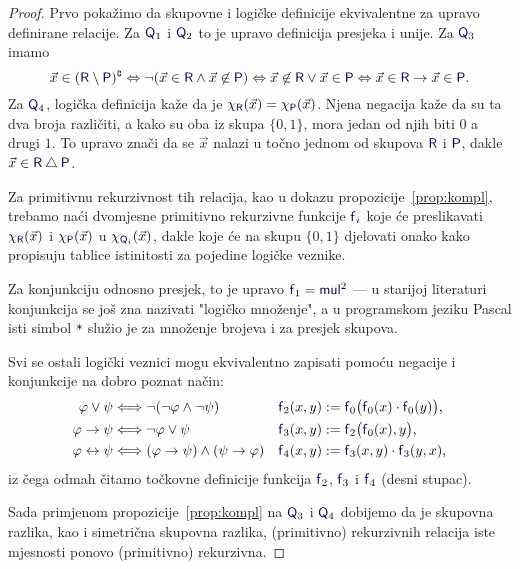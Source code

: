 \begin{proof}
Prvo pokažimo da skupovne i logičke definicije ekvivalentne za upravo definirane relacije. Za $\f Q_1$ i $\f Q_2$ to je upravo definicija presjeka i unije. Za $\f Q_3$ imamo
    \begin{equation}
    \vec x\in(\f R\setminus\f P)\kompl\Leftrightarrow\lnot(\vec x\in\f R\land\vec x\not\in\f P)\Leftrightarrow\vec x\not\in\f R\lor\vec x\in\f P\Leftrightarrow\vec x\in \f R\to\vec x\in\f P\text.
\end{equation}
Za $\f Q_4$, logička definicija kaže da je $\chi_{\f R}(\vec x)=\chi_{\f P}(\vec x)$. Njena negacija kaže da su ta dva broja različiti, a kako su oba iz skupa $\{0,1\}$, mora jedan od njih biti $0$ a drugi $1$. To upravo znači da se $\vec x$ nalazi u točno jednom od skupova $\f R$ i $\f P$, dakle $\vec x\in\f R\mathbin\triangle\f P$.

Za primitivnu rekurzivnost tih relacija, kao u dokazu propozicije~\ref{prop:kompl}, trebamo naći dvomjesne primitivno rekurzivne funkcije $\f f_i$ koje će preslikavati $\chi_{\f R}(\vec x)$ i $\chi_{\f P}(\vec x)$ u $\chi_{\f Q_i}(\vec x)$, dakle koje će na skupu $\{0,1\}$ djelovati onako kako propisuju tablice istinitosti za pojedine logičke veznike.

Za konjunkciju odnosno presjek, to je upravo $\f f_1=\f{mul}^2$ --- u starijoj literaturi konjunkcija se još zna nazivati "logičko množenje", a u programskom jeziku Pascal isti simbol \texttt{*} služio je za množenje brojeva i za presjek skupova.

Svi se ostali logički veznici mogu ekvivalentno zapisati pomoću negacije i konjunkcije na dobro poznat način:
\begin{align}
    \varphi\lor\psi&\Longleftrightarrow\lnot(\lnot\varphi\land\lnot\psi)
    &
    \f f_2(x,y)&:=
    \f f_0\bigl(
      \f f_0(x)\cdot\f f_0(y)
    \bigr)\text,
    \\
    \varphi\to\psi&\Longleftrightarrow\lnot\varphi\lor\psi
    &
    \f f_3(x,y)&:=\f f_2\bigl(\f f_0(x),y\bigr)\text,
    \\
    \varphi\leftrightarrow\psi&\Longleftrightarrow(\varphi\to\psi)\land(\psi\to\varphi)
    &
    \f f_4(x,y)&:=\f f_3(x,y)\cdot\f f_3(y,x)\text,
\end{align}
iz čega odmah čitamo točkovne definicije funkcija $\f f_2$, $\f f_3$ i $\f f_4$ (desni stupac).

Sada primjenom propozicije~\ref{prop:kompl} na $\f Q_3$ i $\f Q_4$ dobijemo da je skupovna razlika, kao i simetrična skupovna razlika, (primitivno) rekurzivnih relacija iste mjesnosti ponovo (primitivno) rekurzivna.
\end{proof}

